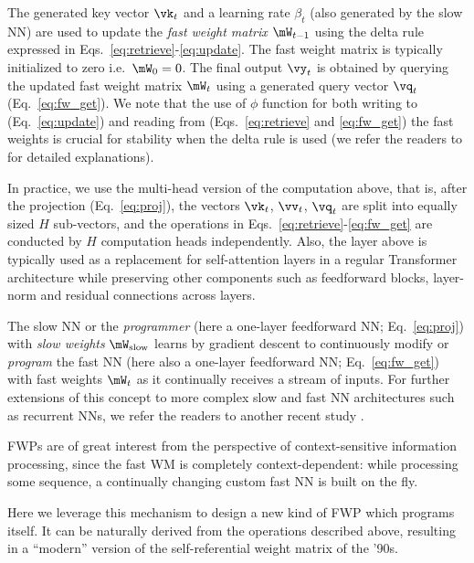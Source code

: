 \documentclass[nohyperref]{article}
\theoremstyle{plain}
\theoremstyle{definition}
\theoremstyle{remark}
\begin{document}
The generated key vector $\vk_t$ and a learning rate $\beta_t$ (also generated by the slow NN) are used to update the \textit{fast weight matrix}
$\mW_{t-1}$ using the delta rule expressed in Eqs.~\ref{eq:retrieve}-\ref{eq:update}.
The fast weight matrix is typically initialized to zero i.e.~$\mW_0=0$.
The final output $\vy_t$ is obtained by querying the updated fast weight matrix $\mW_{t}$
using a generated query vector $\vq_t$ (Eq.~\ref{eq:fw_get}).
We note that the use of $\phi$ function for both writing to (Eq.~\ref{eq:update}) and reading from (Eqs.~\ref{eq:retrieve} and \ref{eq:fw_get})
the fast weights is crucial for stability when
the delta rule is used (we refer the readers to \citet{schlag2021linear} for detailed explanations).

In practice, we use the multi-head version \citep{trafo} of the computation above, that is, after the projection (Eq.~\ref{eq:proj}), the vectors $\vk_t$, $\vv_t$, $\vq_t$ are split into equally sized $H$ sub-vectors, and the operations in Eqs.~\ref{eq:retrieve}-\ref{eq:fw_get}
are conducted by $H$ computation heads independently.
Also, the layer above is typically used as a replacement for self-attention layers in a regular Transformer architecture \citep{trafo}
while preserving other components 
such as feedforward blocks,
layer-norm and residual connections across layers.

The slow NN or the \textit{programmer} (here a one-layer feedforward NN; Eq.~\ref{eq:proj}) with \textit{slow weights} $\mW_\text{slow}$ learns by gradient descent to
continuously modify or \textit{program} the fast NN (here also a one-layer feedforward NN; Eq.~\ref{eq:fw_get}) with fast weights $\mW_{t}$
as it continually receives a stream of inputs.
For further extensions of this concept to more complex slow and fast NN architectures such as recurrent NNs, we refer the readers to another recent study \citep{irie2021going}.

FWPs are of great interest from the perspective of context-sensitive information processing,
since the fast WM is completely context-dependent: while processing some sequence, a continually changing custom fast NN is built on the fly.

Here we leverage this mechanism
to design a new kind of FWP which programs itself.
It can be naturally derived from the operations
described above, resulting in a ``modern'' version of 
the self-referential weight matrix \citep{Schmidhuber:92selfref, Schmidhuber:93selfrefann, Schmidhuber:93selfreficann, Schmidhuber:93selfrefieee} of the '90s.
\end{document}
